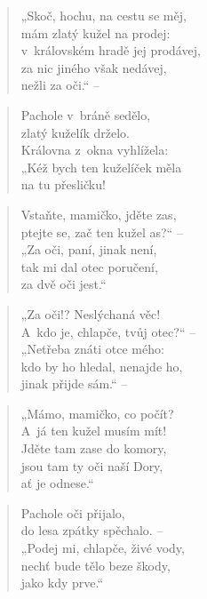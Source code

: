 \begin{verse}
„Skoč, hochu, na cestu se měj, \\
mám zlatý kužel na prodej: \\
v~královském hradě jej prodávej, \\
za nic jiného však nedávej, \\
nežli za oči.“ --
\end{verse}

\begin{verse}
Pachole v~bráně sedělo, \\
zlatý kuželík drželo. \\
Královna z~okna vyhlížela: \\
„Kéž bych ten kuželíček měla \\
na tu přesličku!
\end{verse}

\begin{verse}
Vstaňte, mamičko, jděte zas, \\
ptejte se, zač ten kužel as?“ -- \\
„Za oči, paní, jinak není, \\
tak mi dal otec poručení, \\
za dvě oči jest.“
\end{verse}

\begin{verse}
„Za oči!? Neslýchaná věc! \\
A~kdo je, chlapče, tvůj otec?“ -- \\
„Netřeba znáti otce mého: \\
kdo by ho hledal, nenajde ho, \\
jinak přijde sám.“ --
\end{verse}

\begin{verse}
„Mámo, mamičko, co počít? \\
A~já ten kužel musím mít! \\
Jděte tam zase do komory, \\
jsou tam ty oči naší Dory, \\
ať je odnese.“
\end{verse}

\begin{verse}
Pachole oči přijalo, \\
do lesa zpátky spěchalo. -- \\
„Podej mi, chlapče, živé vody, \\
nechť bude tělo beze škody, \\
jako kdy prve.“
\end{verse}

